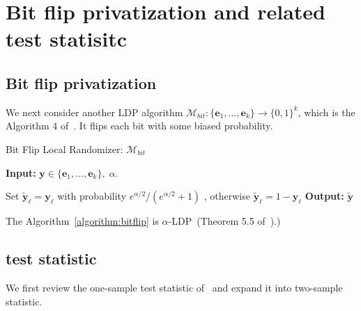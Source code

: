 \documentclass[11pt]{article} %
\begin{document}
\section{Bit flip privatization and related test statisitc}
\subsection{Bit flip privatization}
We next consider another LDP algorithm $\mathcal{M}_{bit} : \{\boldsymbol{e}_1, \ldots, \boldsymbol{e}_k\} \to \{0,1\}^k$, which is the Algorithm 4 of~\citet{Gaboardi2018LDPChisq}. It  flips each bit with some biased probability.
\begin{algorithm}
	\caption{Bit Flip Local Randomizer: $\mathcal{M}_{bit}$ }\label{algorithm:bitflip}
\textbf{Input: } $\boldsymbol{y} \in  \{\boldsymbol{e}_1, \ldots, \boldsymbol{e}_k\}, \;  \alpha$.
\begin{algorithmic}
\For{$\ell \in [k]$}
\State
	Set $\tilde{\boldsymbol{y}}_\ell = \boldsymbol{y}_\ell $ with probability $e^{\alpha/2}/(e^{\alpha/2}+1)$ ,
otherwise 
$\tilde{\boldsymbol{y}}_\ell = 1-\boldsymbol{y}_\ell $
\EndFor
\State \textbf{Output:} $\tilde{\boldsymbol{y}}$
\end{algorithmic}
\end{algorithm}
The Algorithm~\ref{algorithm:bitflip} is $\alpha$-LDP~(Theorem 5.5 of~\citet{Gaboardi2018LDPChisq}).)
\subsection{test statistic}
We first review the one-sample test statistic of~\citet{Gaboardi2018LDPChisq} and expand it into two-sample statistic. 
\end{document}
